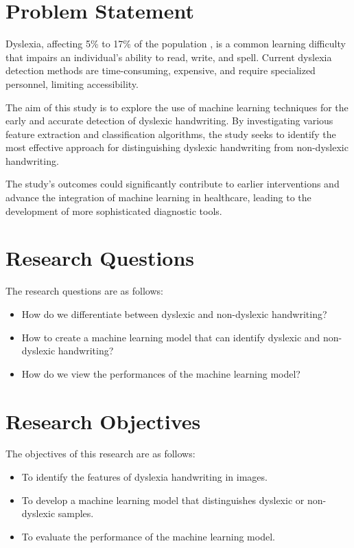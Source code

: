 \section{Problem Statement}
Dyslexia, affecting 5\% to 17\% of the population \parencite{Ramli2020}, is a common learning difficulty that impairs an individual's ability to read, write, and spell. Current dyslexia detection methods are time-consuming, expensive, and require specialized personnel, limiting accessibility. 

The aim of this study is to explore the use of machine learning techniques for the early and accurate detection of dyslexic handwriting. By investigating various feature extraction and classification algorithms, the study seeks to identify the most effective approach for distinguishing dyslexic handwriting from non-dyslexic handwriting. 

The study's outcomes could significantly contribute to earlier interventions and advance the integration of machine learning in healthcare, leading to the development of more sophisticated diagnostic tools.


\newpage
\section{Research Questions}
\noindent The research questions are as follows:
\begin{itemize}
    \item How do we differentiate between dyslexic and non-dyslexic handwriting?
    \item How to create a machine learning model that can identify dyslexic and non-dyslexic handwriting?
    \item How do we view the performances of the machine learning model?
\end{itemize}

\section{Research Objectives}
\noindent The objectives of this research are as follows:
\begin{itemize}
    \item To identify the features of dyslexia handwriting in images.
    \item To develop a machine learning model that distinguishes dyslexic or non-dyslexic samples.
    \item To evaluate the performance of the machine learning model.
\end{itemize}


